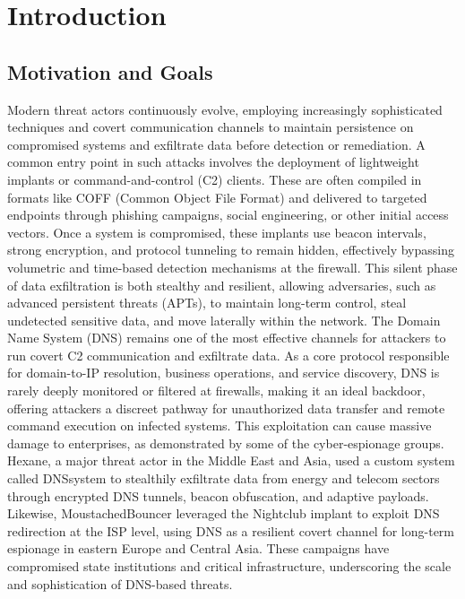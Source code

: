 \documentclass [11pt, proquest] {uwthesis}[2020/02/24]
\begin{document}
%
%

%
 
 
 
%
%

\textpages
 
 
\chapter {Introduction}
\section{Motivation and Goals}
Modern threat actors continuously evolve, employing increasingly sophisticated techniques and covert communication channels to maintain persistence on compromised systems and exfiltrate data before detection or remediation. A common entry point in such attacks involves the deployment of lightweight implants or command-and-control (C2) clients. These are often compiled in formats like COFF (Common Object File Format) and delivered to targeted endpoints through phishing campaigns, social engineering, or other initial access vectors.
Once a system is compromised, these implants use beacon intervals, strong encryption, and protocol tunneling to remain hidden, effectively bypassing volumetric and time-based detection mechanisms at the firewall. This silent phase of data exfiltration is both stealthy and resilient, allowing adversaries, such as advanced persistent threats (APTs), to maintain long-term control, steal undetected sensitive data, and move laterally within the network.
The Domain Name System (DNS) remains one of the most effective channels for attackers to run covert C2 communication and exfiltrate data. As a core protocol responsible for domain-to-IP resolution, business operations, and service discovery, DNS is rarely deeply monitored or filtered at firewalls, making it an ideal backdoor, offering attackers a discreet pathway for unauthorized data transfer and remote command execution on infected systems. 
This exploitation can cause massive damage to enterprises, as demonstrated by some of the cyber-espionage groups. Hexane, a major threat actor in the Middle East and Asia, used a custom system called DNSsystem to stealthily exfiltrate data from energy and telecom sectors through encrypted DNS tunnels, beacon obfuscation, and adaptive payloads. Likewise, MoustachedBouncer leveraged the Nightclub implant to exploit DNS redirection at the ISP level, using DNS as a resilient covert channel for long-term espionage in eastern Europe and Central Asia. These campaigns have compromised state institutions and critical infrastructure, underscoring the scale and sophistication of DNS-based threats.
\end{document}
